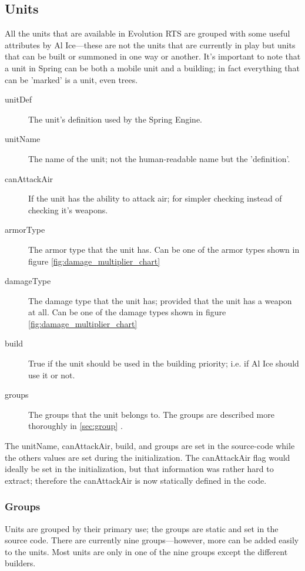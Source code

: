 \subsection{Units}
\label{sec:units}
All the units that are available in Evolution RTS are grouped with some useful attributes by Al
Ice---these are not the units that are currently in play but units that can be built or summoned in
one way or another. It's important to note that a unit in Spring can be both a mobile unit and a
building; in fact everything that can be 'marked' is a unit, even trees.
\begin{description}
\item[unitDef] The unit's definition used by the Spring Engine.
\item[unitName] The name of the unit; not the human-readable name but the 'definition'.
\item[canAttackAir] If the unit has the ability to attack air; for simpler checking instead of
checking it's weapons.
\item[armorType] The armor type that the unit has. Can be one of the armor types shown in figure
\ref{fig:damage_multiplier_chart}
\item[damageType] The damage type that the unit has; provided that the unit has a weapon at all. Can
be one of the damage types shown in figure \ref{fig:damage_multiplier_chart}
\item[build] True if the unit should be used in the building priority; i.e. if Al Ice should use it
or not.
\item[groups] The groups that the unit belongs to. The groups are described more thoroughly in
\ref{sec:group} .
\end{description}
The unitName, canAttackAir, build, and groups are set in the source-code while the others values are
set during the initialization. The canAttackAir flag would ideally be set in the initialization, but
that information was rather hard to extract; therefore the
canAttackAir is now statically defined in the code.

\subsubsection{Groups}
\label{sec:group}
Units are grouped by their primary use; the groups are static and set in the source code. There are
currently nine groups---however, more can be added easily to the units. Most units are only in one
of the nine groups except the different builders.

